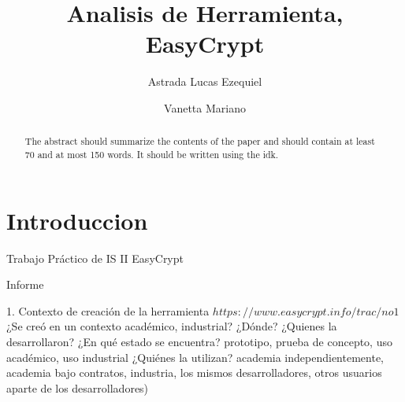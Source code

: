 \documentclass[runningheads,a4paper]{llncs}
\begin{document}
\mainmatter  %

\title{Analisis de Herramienta, EasyCrypt}


%
%
\author{Astrada Lucas Ezequiel
\and Vanetta Mariano}
%


%
%

\maketitle


\begin{abstract}
The abstract should summarize the contents of the paper and should
contain at least 70 and at most 150 words. It should be written using the idk.
\end{abstract}

\section{Introduccion}
Trabajo Práctico de IS II 
EasyCrypt

Informe 

1. Contexto de creación de la herramienta 
$https://www.easycrypt.info/trac/no1$
	¿Se creó en un contexto académico, industrial? 
	¿Dónde? 
	¿Quienes la desarrollaron? 
	¿En qué estado se encuentra? prototipo, prueba de concepto, uso académico, uso industrial 
	¿Quiénes la utilizan? academia independientemente, academia bajo contratos, industria, los mismos desarrolladores, otros usuarios aparte de los desarrolladores)
\end{document}
